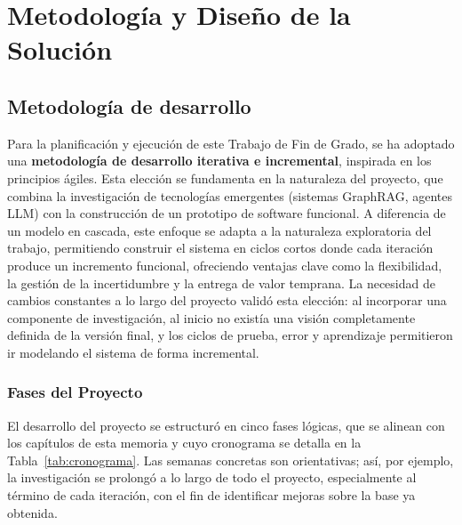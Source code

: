 ﻿\chapter{Metodología y Diseño de la Solución}\label{cap5}

\section{Metodología de desarrollo}
\label{sec:metodologia}

Para la planificación y ejecución de este Trabajo de Fin de Grado, se ha adoptado una \textbf{metodología de desarrollo iterativa e incremental}, inspirada en los principios ágiles. Esta elección se fundamenta en la naturaleza del proyecto, que combina la investigación de tecnologías emergentes (sistemas GraphRAG, agentes LLM) con la construcción de un prototipo de software funcional. A diferencia de un modelo en cascada, este enfoque se adapta a la naturaleza exploratoria del trabajo, permitiendo construir el sistema en ciclos cortos donde cada iteración produce un incremento funcional, ofreciendo ventajas clave como la flexibilidad, la gestión de la incertidumbre y la entrega de valor temprana.
La necesidad de cambios constantes a lo largo del proyecto validó esta elección: al incorporar una componente de investigación, al inicio no existía una visión completamente definida de la versión final, y los ciclos de prueba, error y aprendizaje permitieron ir modelando el sistema de forma incremental.


\newpage
\subsection{Fases del Proyecto}
El desarrollo del proyecto se estructuró en cinco fases lógicas, que se alinean con los capítulos de esta memoria y cuyo cronograma se detalla en la Tabla~\ref{tab:cronograma}. Las semanas concretas son orientativas; así, por ejemplo, la investigación se prolongó a lo largo de todo el proyecto, especialmente al término de cada iteración, con el fin de identificar mejoras sobre la base ya obtenida.

